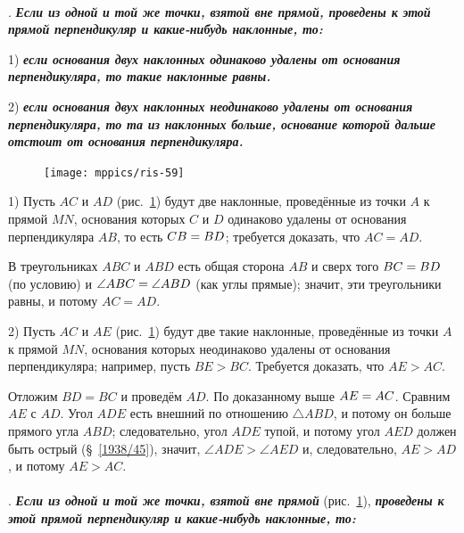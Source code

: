 \documentclass[twoside]{book}
\begin{document}
\paragraph{}\label{1938/54}
\mbox{.}
\textbf{\emph{Если из одной и той же точки, взятой вне прямой, проведены к этой прямой перпендикуляр и какие-нибудь наклонные, то:}}

1) \textbf{\emph{если основания двух наклонных одинаково удалены от основания перпендикуляра, то такие наклонные равны.}}

2) \textbf{\emph{если основания двух наклонных неодинаково удалены от основания перпендикуляра, то та из наклонных больше, основание которой дальше отстоит от основания перпендикуляра.}}

\begin{figure}
\centering
\texttt{[image: mppics/ris-59]}
\caption{}\label{1938/ris-59}
\end{figure}

1) Пусть $AC$ и $AD$ (рис.~\ref{1938/ris-59}) будут две наклонные, проведённые из точки $A$ к прямой $MN$, основания которых $C$ и $D$ одинаково удалены от основания перпендикуляра $AB$, то есть $CB\z=BD$;
требуется доказать, что $AC = AD$.

В треугольниках $ABC$ и $ABD$ есть общая сторона $AB$ и сверх того $BC\z=BD$ (по условию) и $\angle ABC \z= \angle ABD$ (как углы прямые);
значит, эти треугольники равны, и потому $AC = AD$.

2) Пусть $AC$ и $AE$ (рис.~\ref{1938/ris-59}) будут две такие наклонные, проведённые из точки $A$ к прямой $MN$, основания которых неодинаково удалены от основания перпендикуляра;
например, пусть $BE>BC$.
Требуется доказать, что $AE>AC$.

Отложим $BD=BC$ и проведём $AD$.
По доказанному выше $AE \z= AC$.
Сравним $AE$ с $AD$.
Угол $ADE$ есть внешний по отношению $\triangle ABD$, и потому он больше прямого угла $ABD$;
следовательно, угол $ADE$ тупой, и потому угол $AED$ должен быть острый (§~\ref{1938/45}), значит, $\angle ADE>\angle AED$ и, следовательно, $AE>AD$, и потому $AE>AC$.

\paragraph{}\label{1938/55}
.
\textbf{\emph{Если из одной и той же точки, взятой вне прямой}} (рис.~\ref{1938/ris-59}), \textbf{\emph{проведены к этой прямой перпендикуляр и какие-нибудь наклонные, то:}}
\end{document}
